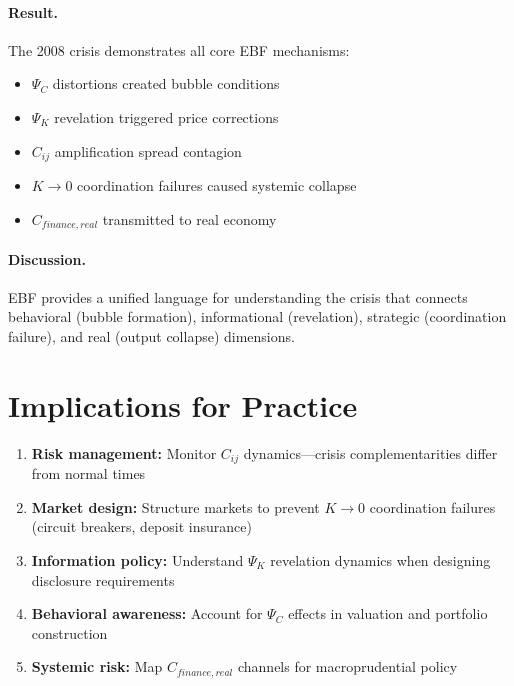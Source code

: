 \paragraph{Result.}
The 2008 crisis demonstrates all core EBF mechanisms:
\begin{itemize}
    \item $\Psi_C$ distortions created bubble conditions
    \item $\Psi_K$ revelation triggered price corrections
    \item $C_{ij}$ amplification spread contagion
    \item $K \to 0$ coordination failures caused systemic collapse
    \item $C_{finance, real}$ transmitted to real economy
\end{itemize}

\paragraph{Discussion.}
EBF provides a unified language for understanding the crisis that connects
behavioral (bubble formation), informational (revelation), strategic
(coordination failure), and real (output collapse) dimensions.


\section{Implications for Practice}
\label{sec:Y-practice}

\begin{tcolorbox}[colback=green!5!white, colframe=green!75!black,
    title=Practical Implications]
\begin{enumerate}
\item \textbf{Risk management:} Monitor $C_{ij}$ dynamics---crisis
    complementarities differ from normal times
\item \textbf{Market design:} Structure markets to prevent $K \to 0$
    coordination failures (circuit breakers, deposit insurance)
\item \textbf{Information policy:} Understand $\Psi_K$ revelation dynamics
    when designing disclosure requirements
\item \textbf{Behavioral awareness:} Account for $\Psi_C$ effects in
    valuation and portfolio construction
\item \textbf{Systemic risk:} Map $C_{finance, real}$ channels for
    macroprudential policy
\end{enumerate}
\end{tcolorbox}


